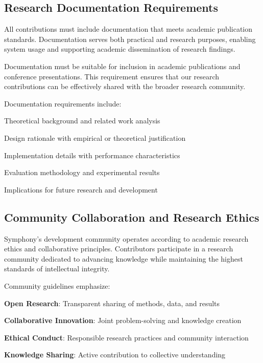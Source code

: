 \subsection*{Research Documentation Requirements}

All contributions must include documentation that meets academic publication standards. Documentation serves both practical and research purposes, enabling system usage and supporting academic dissemination of research findings.

\begin{infobox}[title=Academic Documentation Standards]
Documentation must be suitable for inclusion in academic publications and conference presentations. This requirement ensures that our research contributions can be effectively shared with the broader research community.
\end{infobox}

Documentation requirements include:
\begin{compactlist}
    \item Theoretical background and related work analysis
    \item Design rationale with empirical or theoretical justification
    \item Implementation details with performance characteristics
    \item Evaluation methodology and experimental results
    \item Implications for future research and development
\end{compactlist}

\subsection*{Community Collaboration and Research Ethics}

Symphony's development community operates according to academic research ethics and collaborative principles. Contributors participate in a research community dedicated to advancing knowledge while maintaining the highest standards of intellectual integrity.

Community guidelines emphasize:
\begin{expandedlist}
    \item \textbf{Open Research}: Transparent sharing of methods, data, and results
    \item \textbf{Collaborative Innovation}: Joint problem-solving and knowledge creation
    \item \textbf{Ethical Conduct}: Responsible research practices and community interaction
    \item \textbf{Knowledge Sharing}: Active contribution to collective understanding
\end{expandedlist}

